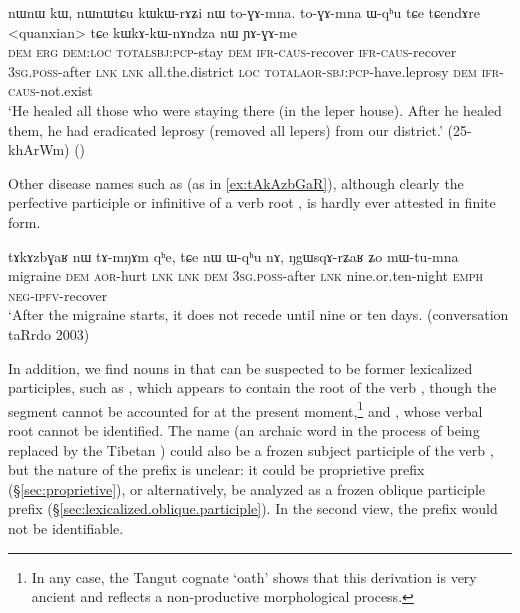 \begin{exe}
\ex \label{ex:kWkAkWnAndza}
 \gll nɯnɯ kɯ, nɯnɯtɕu kɯ\redp{}kɯ-rɤʑi nɯ to-ɣɤ-mna. to-ɣɤ-mna ɯ-qʰu tɕe tɕendɤre <quanxian> tɕe kɯ\redp{}kɤ-kɯ-nɤndza nɯ ɲɤ-ɣɤ-me \\
 \textsc{dem} \textsc{erg} \textsc{dem}:\textsc{loc} \textsc{total}\redp{}\textsc{sbj}:\textsc{pcp}-stay \textsc{dem} \textsc{ifr}-\textsc{caus}-recover  \textsc{ifr}-\textsc{caus}-recover  \textsc{3sg}.\textsc{poss}-after \textsc{lnk} \textsc{lnk} all.the.district \textsc{loc} \textsc{total}\redp{}\textsc{aor}-\textsc{sbj}:\textsc{pcp}-have.leprosy \textsc{dem} \textsc{ifr}-\textsc{caus}-not.exist \\
\glt `He healed all those who were staying there (in the leper house). After he healed them, he had eradicated leprosy (removed all lepers) from our district.' (25-khArWm) ()
\end{exe}

Other disease names such as  (as in \ref{ex:tAkAzbGaR}), although clearly the perfective participle or infinitive of a verb root , is hardly ever attested in finite form.

\begin{exe}
\ex \label{ex:tAkAzbGaR}
 \gll tɤkɤzbɣaʁ nɯ tɤ-mŋɤm qʰe, tɕe nɯ ɯ-qʰu nɤ, ŋgɯsqɤ-rʑaʁ ʑo mɯ-tu-mna \\
 migraine \textsc{dem} \textsc{aor}-hurt \textsc{lnk} \textsc{lnk} \textsc{dem} \textsc{3sg}.\textsc{poss}-after \textsc{lnk} nine.or.ten-night \textsc{emph} \textsc{neg}-\textsc{ipfv}-recover \\
\glt `After the migraine starts, it does not recede until nine or ten days. (conversation taRrdo 2003)
\end{exe}

In addition, we find nouns in  that can be suspected to be former lexicalized participles, such as , which appears to contain the root of the verb   , though the segment  cannot be accounted for at the present moment,\footnote{In any case, the Tangut cognate   `oath' shows that this derivation is very ancient and reflects a non-productive morphological process. } and , whose verbal root cannot be identified. The name  (an archaic word in the process of being replaced by the Tibetan ) could also be a frozen subject participle  of the verb , but the nature of the prefix  is unclear: it could be proprietive prefix (§\ref{sec:proprietive}), or alternatively, be analyzed as a frozen oblique participle prefix (§\ref{sec:lexicalized.oblique.participle}). In the second view, the prefix  would not be identifiable.


